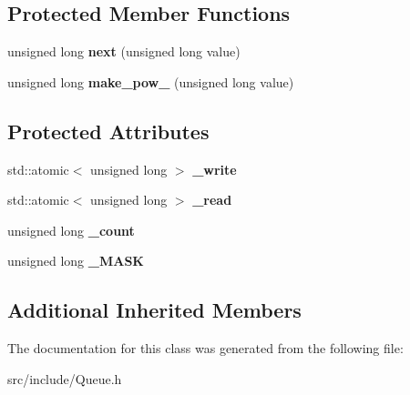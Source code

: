 \subsection*{Protected Member Functions}
\begin{DoxyCompactItemize}
\item 
\hypertarget{class_queue_a206f46f31c9a4cb521a511eca2457472}{unsigned long {\bfseries next} (unsigned long value)}\label{class_queue_a206f46f31c9a4cb521a511eca2457472}

\item 
\hypertarget{class_queue_aadcb41bd20db15ae8b24dd3d5b8beb25}{unsigned long {\bfseries make\+\_\+pow\+\_} (unsigned long value)}\label{class_queue_aadcb41bd20db15ae8b24dd3d5b8beb25}

\end{DoxyCompactItemize}
\subsection*{Protected Attributes}
\begin{DoxyCompactItemize}
\item 
\hypertarget{class_queue_a3e0f32f37c7b00323a20ae208cf27b8b}{std\+::atomic$<$ unsigned long $>$ {\bfseries \+\_\+write}}\label{class_queue_a3e0f32f37c7b00323a20ae208cf27b8b}

\item 
\hypertarget{class_queue_a39f0f79c589cf77f8f5a6b19fbd69a6f}{std\+::atomic$<$ unsigned long $>$ {\bfseries \+\_\+read}}\label{class_queue_a39f0f79c589cf77f8f5a6b19fbd69a6f}

\item 
\hypertarget{class_queue_ab0ec54e36274844ba9b82467122c456e}{unsigned long {\bfseries \+\_\+count}}\label{class_queue_ab0ec54e36274844ba9b82467122c456e}

\item 
\hypertarget{class_queue_a872b60c3f965d749c74585e80c1db75b}{unsigned long {\bfseries \+\_\+\+M\+A\+S\+K}}\label{class_queue_a872b60c3f965d749c74585e80c1db75b}

\end{DoxyCompactItemize}
\subsection*{Additional Inherited Members}


The documentation for this class was generated from the following file\+:\begin{DoxyCompactItemize}
\item 
src/include/Queue.\+h\end{DoxyCompactItemize}
